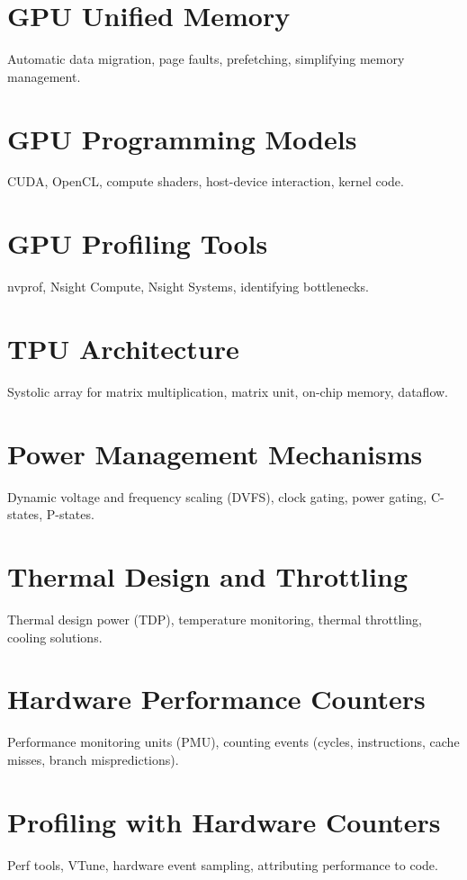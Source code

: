 \chapter{GPU Unified Memory}
Automatic data migration, page faults, prefetching, simplifying memory management.

\chapter{GPU Programming Models}
CUDA, OpenCL, compute shaders, host-device interaction, kernel code.

\chapter{GPU Profiling Tools}
nvprof, Nsight Compute, Nsight Systems, identifying bottlenecks.

\chapter{TPU Architecture}
Systolic array for matrix multiplication, matrix unit, on-chip memory, dataflow.


\chapter{Power Management Mechanisms}
Dynamic voltage and frequency scaling (DVFS), clock gating, power gating, C-states, P-states.

\chapter{Thermal Design and Throttling}
Thermal design power (TDP), temperature monitoring, thermal throttling, cooling solutions.

\chapter{Hardware Performance Counters}
Performance monitoring units (PMU), counting events (cycles, instructions, cache misses, branch mispredictions).

\chapter{Profiling with Hardware Counters}
Perf tools, VTune, hardware event sampling, attributing performance to code.

